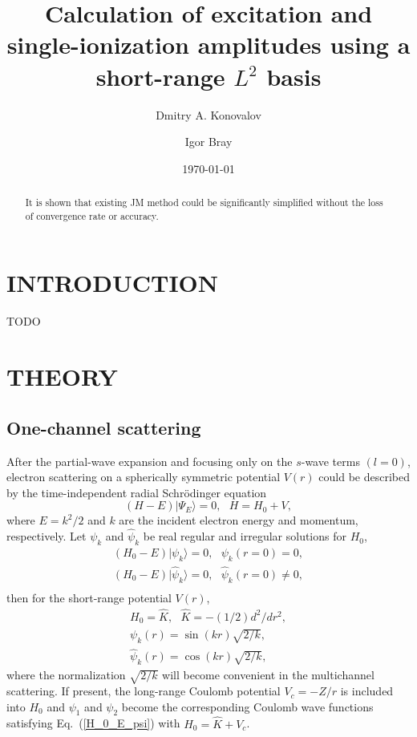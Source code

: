 \documentclass[aip
, pra
, showpacs
, aps
, twocolumn
, groupedaddress
, floatfix
]{revtex4}
\newcommand{\beq}{\begin{equation}}
\newcommand{\eeq}{\end{equation}}
\newcommand{\barr}{\begin{array}}
\newcommand{\earr}{\end{array}}
\begin{document}
\title {Calculation of excitation and single-ionization amplitudes using a short-range $L^2$ basis}

\author{Dmitry A. Konovalov}

\author{Igor Bray}


\date{\today}

\begin{abstract}
It is shown that existing JM method could be significantly simplified without the loss of convergence rate or accuracy.

\end{abstract}

\maketitle

\section{INTRODUCTION}
TODO

\section{THEORY}
\subsection{One-channel scattering}


After the partial-wave expansion \cite{Taylor72,N82} and focusing only on the $s$-wave terms $(l=0)$,
electron scattering on a spherically symmetric potential $V(r)$
could be described by the time-independent radial Schr\"odinger equation
\beq
(H-E) | \Psi_E \rangle =0,  \ \ \ H = H_0 + V, \label{H_E_Psi_E}
\eeq
where $E=k^2/2$ and $k$ are the incident electron energy and momentum, respectively.
Let $\psi_k$ and $\widehat{\psi}_k$ be real regular and irregular solutions for $H_0$,
\beq \barr{l}
(H_0-E) | \psi_k \rangle =0,  \ \ \ \psi_k(r=0) = 0,\\
(H_0-E) | \widehat{\psi}_k \rangle =0,  \ \ \ \widehat{\psi}_k(r=0) \neq 0,\\
\earr \label{H_0_E_psi}\eeq
then for the short-range potential $V(r)$,
\beq \barr{l}
H_0 = \hat{K},\ \ \ \hat{K} = -(1/2) d^2/dr^2,\\
\psi_k(r) = \sin(kr) \sqrt{2/k},\\
\widehat{\psi}_k(r) = \cos(kr) \sqrt{2/k},
\earr \label{K} \eeq
where the normalization $\sqrt{2/k}$ will become convenient in the multichannel scattering.
If present, the long-range Coulomb potential $V_c=-Z/r$ is included into $H_0$
and $\psi_1$ and $\psi_2$ become the corresponding Coulomb wave functions satisfying Eq.~(\ref{H_0_E_psi})
with $H_0 = \hat{K} + V_c$.
\end{document}
